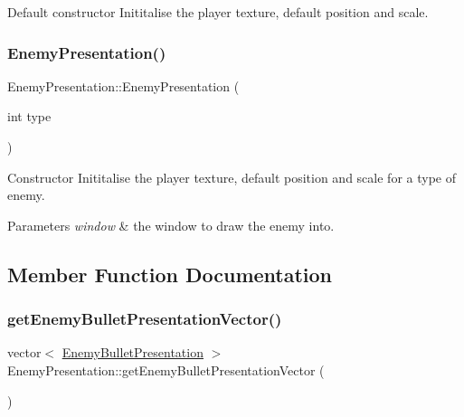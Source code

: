 Default constructor Inititalise the player texture, default position and scale. \mbox{\label{class_enemy_presentation_a78e7f250c31e2e6d6327ead1ef12f4c8}} 
\subsubsection{\texorpdfstring{Enemy\+Presentation()}{EnemyPresentation()}\hspace{0.1cm}{\footnotesize\ttfamily [2/2]}}
{\footnotesize\ttfamily Enemy\+Presentation\+::\+Enemy\+Presentation (\begin{DoxyParamCaption}\item[{int}]{type }\end{DoxyParamCaption})}



Constructor Inititalise the player texture, default position and scale for a type of enemy. 


\begin{DoxyParams}{Parameters}
{\em window} & the window to draw the enemy into. \\
\hline
\end{DoxyParams}


\subsection{Member Function Documentation}
\mbox{\label{class_enemy_presentation_a64c5863ad2f83c1414cf69882293e4b9}} 
\subsubsection{\texorpdfstring{get\+Enemy\+Bullet\+Presentation\+Vector()}{getEnemyBulletPresentationVector()}}
{\footnotesize\ttfamily vector$<$ \hyperlink{class_enemy_bullet_presentation}{Enemy\+Bullet\+Presentation} $>$ Enemy\+Presentation\+::get\+Enemy\+Bullet\+Presentation\+Vector (\begin{DoxyParamCaption}{ }\end{DoxyParamCaption})}



